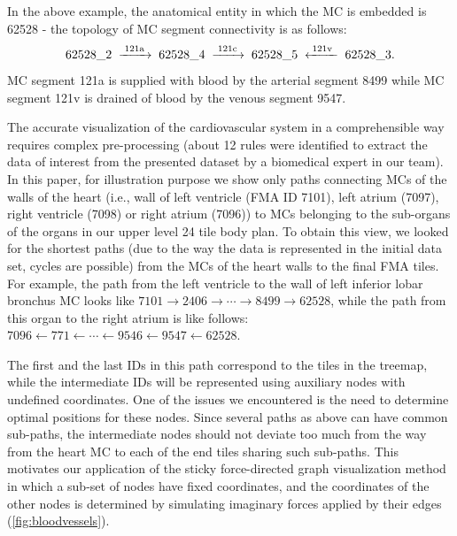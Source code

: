 In the above example, the anatomical entity in which the MC is embedded is 62528 - the topology of MC segment connectivity is as follows:
\[
	62528\_2  \;\xrightarrow{\;\text{121a}\;}\;
	62528\_4  \;\xrightarrow{\;\text{121c}\;}\;
	62528\_5  \;\xleftarrow {\;\text{121v}\;}\;
	62528\_3  \text.
\]
MC segment 121a is supplied with blood by the arterial segment 8499 while MC segment 121v is drained of blood by the venous segment 9547.

The accurate visualization of the cardiovascular system in a comprehensible way requires complex pre-processing (about 12 rules were identified to extract the data of interest from the presented dataset by a biomedical expert in our team).
In this paper, for illustration purpose we show only paths connecting MCs of the walls of the heart (i.e., wall of left ventricle (FMA ID 7101), left atrium (7097), right ventricle (7098) or right atrium (7096)) to MCs belonging to the sub-organs of the organs in our upper level 24 tile body plan.
To obtain this view, we looked for the shortest paths (due to the way the data is represented in the initial data set, cycles are possible) from the MCs of the heart walls to the final FMA tiles. For example, the path from the left ventricle to the wall of left inferior lobar bronchus MC looks like
{$7101 \rightarrow 2406 \rightarrow \cdots \rightarrow 8499 \rightarrow 62528$,}
while the path from this organ to the right atrium is like follows:
{$7096 \leftarrow 771 \leftarrow \cdots \leftarrow 9546 \leftarrow 9547 \leftarrow 62528$.}

The first and the last IDs in this path correspond to the tiles in the treemap, while the intermediate IDs will be represented using auxiliary nodes with undefined coordinates. One of the issues we encountered is the need to determine optimal positions for these nodes. Since several paths as above can have common sub-paths, the intermediate nodes should not deviate too much from the way from the heart MC to each of the end tiles sharing such sub-paths. This motivates our application of the sticky force-directed graph visualization method~\cite{FR91,Bos14} in which a sub-set of nodes have fixed coordinates, and the coordinates of the other nodes is determined by simulating imaginary forces applied by their edges (\cref{fig:bloodvessels}).

